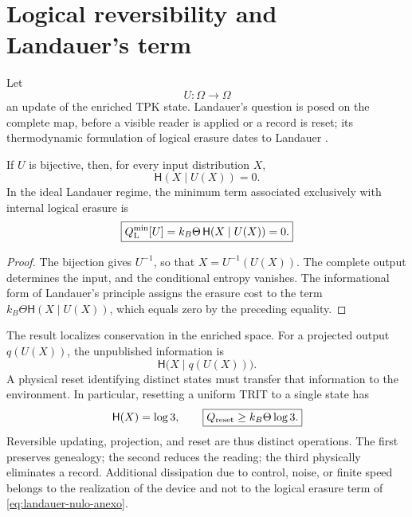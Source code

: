 \section{Logical reversibility and Landauer's term}

Let
\[
 U:\Omega\longrightarrow\Omega
\]
an update of the enriched TPK state. Landauer's question is posed on the
complete map, before a visible reader is applied or a record is reset; its
thermodynamic formulation of logical erasure dates to Landauer
\cite{Landauer1961}.

\begin{theorem}
\label{thm:landauer-nulo-tpk-anexo}
If \(U\) is bijective, then, for every input distribution \(X\),
\begin{equation}
 \mathsf H(X\mid U(X))=0.
 \label{eq:landauer-entropia-cero-anexo}
\end{equation}
In the ideal Landauer regime, the minimum term associated exclusively with internal logical erasure is
\begin{equation}
 \boxed{
 Q_{\rm L}^{\min}[U]
 =k_B\Theta\,\mathsf H(X\mid U(X))=0.}
 \label{eq:landauer-nulo-anexo}
\end{equation}
\end{theorem}

\begin{proof}
The bijection gives \(U^{-1}\), so that
\(X=U^{-1}(U(X))\). The complete output determines the input, and the conditional
entropy vanishes. The informational form of Landauer's principle assigns
the erasure cost to the term \(k_B\Theta\mathsf H(X\mid U(X))\), which equals zero by the
preceding equality.
\end{proof}

The result localizes conservation in the enriched space. For a
projected output \(q(U(X))\), the unpublished information is
\begin{equation}
 \mathsf H\bigl(X\mid q(U(X))\bigr).
 \label{eq:informacion-proyeccion-anexo}
\end{equation}
A physical reset identifying distinct states must transfer that
information to the environment. In particular, resetting a uniform TRIT to a single
state has
\[
 \mathsf H(X)=\log3,
 \qquad
 \boxed{Q_{\rm reset}\geq k_B\Theta\log3.}
\]
Reversible updating, projection, and reset are thus distinct
operations. The first preserves genealogy; the second reduces the reading; the
third physically eliminates a record. Additional dissipation due to
control, noise, or finite speed belongs to the realization of the
device and not to the logical erasure term of
\eqref{eq:landauer-nulo-anexo}.

